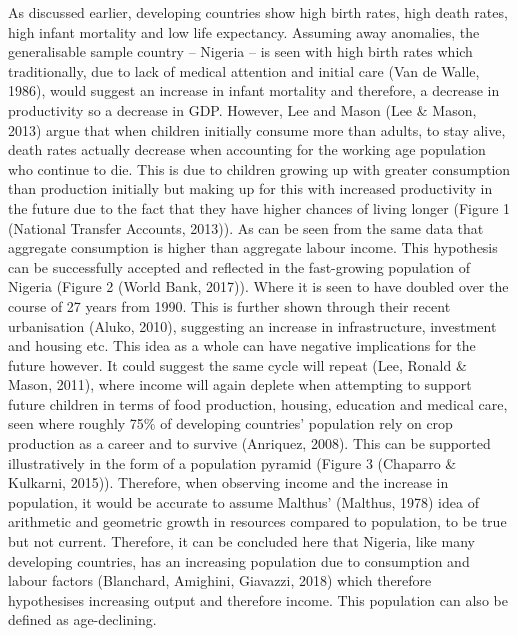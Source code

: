\documentclass[11pt, english]{article}
\begin{document}
	As discussed earlier, developing countries show high birth rates, high death rates, high infant mortality and low life expectancy. Assuming away anomalies, the generalisable sample country – Nigeria – is seen with high birth rates which traditionally, due to lack of medical attention and initial care (Van de Walle, 1986), would suggest an increase in infant mortality and therefore, a decrease in productivity so a decrease in GDP. However, Lee and Mason (Lee \& Mason, 2013) argue that when children initially consume more than adults, to stay alive, death rates actually decrease when accounting for the working age population who continue to die. This is due to children growing up with greater consumption than production initially but making up for this with increased productivity in the future due to the fact that they have higher chances of living longer (Figure 1 (National Transfer Accounts, 2013)). As can be seen from the same data that aggregate consumption is higher than aggregate labour income. This hypothesis can be successfully accepted and reflected in the fast-growing population of Nigeria (Figure 2 (World Bank, 2017)). Where it is seen to have doubled over the course of 27 years from 1990. This is further shown through their recent urbanisation (Aluko, 2010), suggesting an increase in infrastructure, investment and housing etc. This idea as a whole can have negative implications for the future however. It could suggest the same cycle will repeat (Lee, Ronald \& Mason, 2011), where income will again deplete when attempting to support future children in terms of food production, housing, education and medical care, seen where roughly 75\% of developing countries’ population rely on crop production as a career and to survive (Anriquez, 2008). This can be supported illustratively in the form of a population pyramid (Figure 3 (Chaparro \& Kulkarni, 2015)). Therefore, when observing income and the increase in population, it would be accurate to assume Malthus’ (Malthus, 1978) idea of arithmetic and geometric growth in resources compared to population, to be true but not current. Therefore, it can be concluded here that Nigeria, like many developing countries, has an increasing population due to consumption and labour factors (Blanchard, Amighini, Giavazzi, 2018) which therefore hypothesises increasing output and therefore income. This population can also be defined as age-declining.\\
\end{document}
